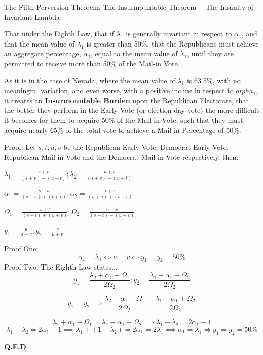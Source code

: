 \begin{theorem}{The Fifth Perversion Theorem, The Insurmountable Theorem--- The Insanity of Invariant Lambda}

That under the Eighth Law, that if $\lambda_{1}$ is generally invariant in respect to $\alpha_{1}$, and that the mean value of $\lambda_{1}$ is greater than 50\%, that the Republicans must achieve an aggregate percentage, $\alpha_{1}$, equal to the mean value of $\lambda_{1}$, until they are permitted to receive more than 50\% of the Mail-in Vote.

As it is in the case of Nevada, where the mean value of $\lambda_{1}$ is 63.5\%, with no meaningful variation, and even worse, with a positive incline in respect to $alpha_{1}$, it creates an \textbf{Insurmountable Burden} upon the Republican Electorate, that the better they perform in the Early Vote (or election day vote) the more difficult it becomes for them to acquire 50\% of the Mail-in Vote, such that they must acquire nearly 65\% of the total vote to achieve a Mail-in Percentage of 50\%.

Proof:
Let $s,t,u,v$ be the Republican Early Vote, Democrat Early Vote, Republican Mail-in Vote and the Democrat Mail-in Vote respectively, then:

$\lambda_{1}=\frac{s+v}{(s+v)+(u+t)}; \lambda_{2}=\frac{u+t}{(s+v)+(u+t)}$

$\alpha_{1}=\frac{s+u}{(s+u)+(t+v)}; \alpha_{2}=\frac{t+v}{(s+u)+(t+v)}$

$\Omega_{1}=\frac{s+t}{(s+t)+(u+v)}; \Omega_{2}=\frac{u+v}{(s+t)+(u+v)}$

$y_{1}=\frac{u}{u+v}; y_{2}=\frac{v}{u+v}$

Proof One:
$$\alpha_{1}=\lambda_{1} \iff u=v \iff y_{1}=y_{2}=50\%$$
Proof Two: The Eighth Law states...
$$y_{1}=\frac{\lambda_{2}+\alpha_{1}-\Omega_{1}}{2\Omega_{2}}; y_{2}=\frac{\lambda_{1}-\alpha_{1}+\Omega_{2}}{2\Omega_{2}}$$

$$y_{1}=y_{2} \implies \frac{\lambda_{2}+\alpha_{1}-\Omega_{1}}{2\Omega_{2}}=\frac{\lambda_{1}-\alpha_{1}+\Omega_{2}}{2\Omega_{2}}$$

$$\lambda_{2}+\alpha_{1}-\Omega_{1}=\lambda_{1}-\alpha_{1}+\Omega_{2} \implies \lambda_{1}-\lambda_{2}=2\alpha_{1}-1$$
$$\lambda_{1}-\lambda_{2}=2\alpha_{1}-1 \implies \lambda_{1}+(1-\lambda_{2})=2\alpha_{1}=2\lambda_{1} \implies \alpha_{1}=\lambda_{1} \iff y_{1}=y_{2}=50\%$$
\begin{flushright}
\textbf{Q.E.D}
\end{flushright}
\end{theorem}
